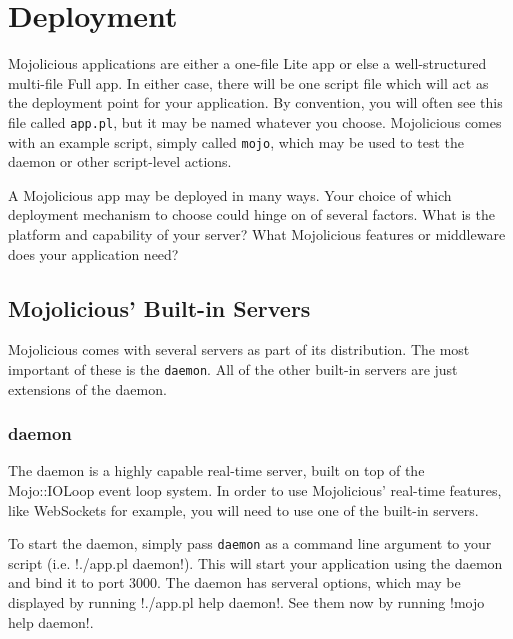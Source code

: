 
\section{Deployment}

Mojolicious applications are either a one-file Lite app
or else a well-structured multi-file Full app.
In either case, there will be one script file which will act as the deployment point for your application.
By convention, you will often see this file called \verb!app.pl!, but it may be named whatever you choose.
Mojolicious comes with an example script, simply called \verb!mojo!, which may be used to test the daemon or other script-level actions.

A Mojolicious app may be deployed in many ways.
Your choice of which deployment mechanism to choose could hinge on of several factors.
What is the platform and capability of your server?
What Mojolicious features or  middleware does your application need?

\subsection{Mojolicious' Built-in Servers}

Mojolicious comes with several servers as part of its distribution.
The most important of these is the \verb!daemon!.
All of the other built-in servers are just extensions of the daemon.

\subsubsection{daemon}

The daemon is a highly capable real-time server, built on top of the Mojo::IOLoop event loop system.
In order to use Mojolicious' real-time features, like WebSockets for example,
you will need to use one of the built-in servers.

To start the daemon, simply pass \verb!daemon! as a command line argument to your script (i.e. \lstbash!./app.pl daemon!). 
This will start your application using the daemon and bind it to port 3000.
The daemon has serveral options, which may be displayed by running \lstbash!./app.pl help daemon!.
See them now by running \lstbash!mojo help daemon!.


